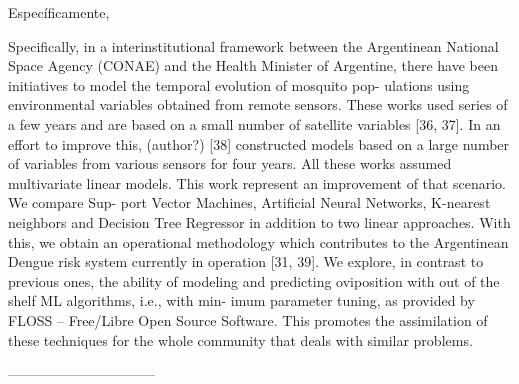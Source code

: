 Específicamente,

Specifically, in a interinstitutional framework between the Argentinean
National Space Agency (CONAE) and the Health Minister of Argentine,
there have been initiatives to model the temporal evolution of mosquito pop-
ulations using environmental variables obtained from remote sensors. These
works used series of a few years and are based on a small number of satellite
variables [36, 37]. In an effort to improve this, (author?) [38] constructed
models based on a large number of variables from various sensors for four
years. All these works assumed multivariate linear models.
This work represent an improvement of that scenario. We compare Sup-
port Vector Machines, Artificial Neural Networks, K-nearest neighbors and
Decision Tree Regressor in addition to two linear approaches. With this,
we obtain an operational methodology which contributes to the Argentinean
Dengue risk system currently in operation [31, 39].
We explore, in contrast to previous ones, the ability of modeling and
predicting oviposition with out of the shelf ML algorithms, i.e., with min-
imum parameter tuning, as provided by FLOSS – Free/Libre Open Source
Software. This promotes the assimilation of these techniques for the whole
community that deals with similar problems.



--------------------------------








